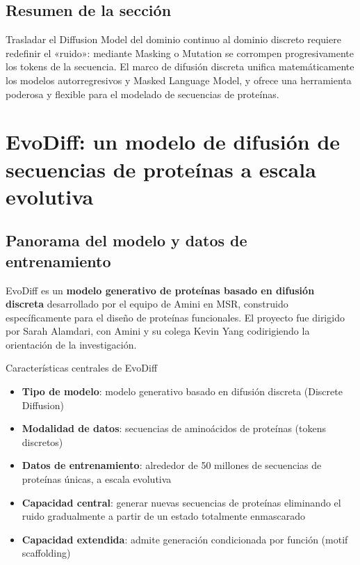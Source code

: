 \documentclass[a4paper]{article}
\begin{document}
\subsection{Resumen de la sección}

Trasladar el Diffusion Model del dominio continuo al dominio discreto requiere redefinir el «ruido»: mediante Masking o Mutation se corrompen progresivamente los tokens de la secuencia. El marco de difusión discreta unifica matemáticamente los modelos autorregresivos y Masked Language Model, y ofrece una herramienta poderosa y flexible para el modelado de secuencias de proteínas.


\section{EvoDiff: un modelo de difusión de secuencias de proteínas a escala evolutiva}

\subsection{Panorama del modelo y datos de entrenamiento}

EvoDiff es un \textbf{modelo generativo de proteínas basado en difusión discreta} desarrollado por el equipo de Amini en MSR, construido específicamente para el diseño de proteínas funcionales. El proyecto fue dirigido por Sarah Alamdari, con Amini y su colega Kevin Yang codirigiendo la orientación de la investigación.

\begin{importantbox}{Características centrales de EvoDiff}
\begin{itemize}
    \item \textbf{Tipo de modelo}: modelo generativo basado en difusión discreta (Discrete Diffusion)
    \item \textbf{Modalidad de datos}: secuencias de aminoácidos de proteínas (tokens discretos)
    \item \textbf{Datos de entrenamiento}: alrededor de 50 millones de secuencias de proteínas únicas, a escala evolutiva
    \item \textbf{Capacidad central}: generar nuevas secuencias de proteínas eliminando el ruido gradualmente a partir de un estado totalmente enmascarado
    \item \textbf{Capacidad extendida}: admite generación condicionada por función (motif scaffolding)
\end{itemize}
\end{importantbox}
\end{document}
